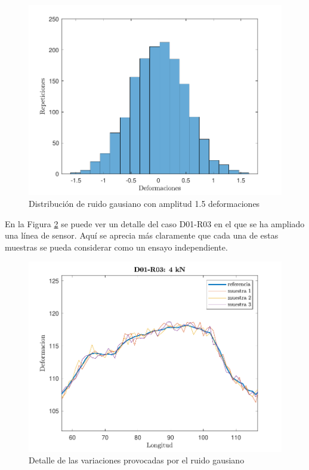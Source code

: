 \begin{figure}[h!]
    \centering
    \includegraphics[width=125mm, angle=0]{3/Fotos/histo_ruido_OBR.pdf}
    \captionsetup{justification=centering,margin=1.25cm}
    \caption{Distribución de ruido gausiano con amplitud 1.5 deformaciones}
    \label{OBRR_ruido}
\end{figure}
    
En la Figura \ref{fig:OBRR_det} se puede ver un detalle del caso D01-R03 en el que se ha ampliado una línea de sensor. Aquí se aprecia más claramente que cada una de estas muestras se pueda considerar como un ensayo independiente.
    
\begin{figure}[h!]
    \centering
    \includegraphics[width=125mm, angle=0]{3/Fotos/detalle_OBR_ruido.pdf}
    \captionsetup{justification=centering,margin=1.25cm}
    \caption{Detalle de las variaciones provocadas por el ruido gausiano}
    \label{fig:OBRR_det}
\end{figure}
   
